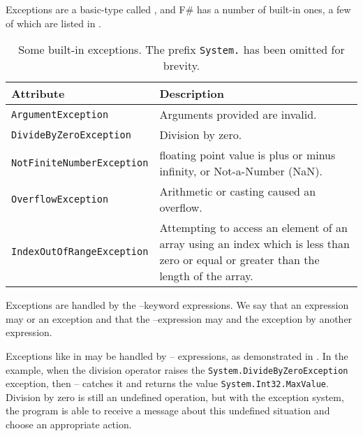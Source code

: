 \documentclass[fsharpNotes.tex]{subfiles}
\begin{document}
Exceptions are a basic-type called , and F\# has a number of built-in ones, a few of which are listed in .
\begin{table}
  \centering
  \begin{tabularx}{\linewidth}{|l|X|}
    \hline
    \rowcolor{headerRowColor} Attribute & Description\\
    \hline
    \lstinline!ArgumentException! & Arguments provided are invalid.\\
    \hline
    \lstinline!DivideByZeroException! & Division by zero.\\
    \hline
    \lstinline!NotFiniteNumberException! & floating point value is plus or minus infinity, or Not-a-Number (NaN).\\
    \hline
    \lstinline!OverflowException! & Arithmetic or casting caused an overflow.\\
    \hline
    \lstinline!IndexOutOfRangeException! & Attempting to access an element of an array using an index which is less than zero or equal or greater than the length of the array.\\
    \hline
  \end{tabularx}
  \caption{Some built-in exceptions. The prefix \lstinline{System.} has been omitted for brevity.}
  \label{tab:exceptions}
\end{table}

Exceptions are handled by the --keyword expressions. We say that an expression may  or  an exception and that the --expression may  and  the exception by another expression.

Exceptions like in  may be handled by -- expressions, as demonstrated in .
%
%
In the example, when the division operator raises the \lstinline{System.DivideByZeroException} exception, then -- catches it and returns the value \lstinline{System.Int32.MaxValue}. Division by zero is still an undefined operation, but with the exception system, the program is able to receive a message about this undefined situation and choose an appropriate action.
\end{document}
